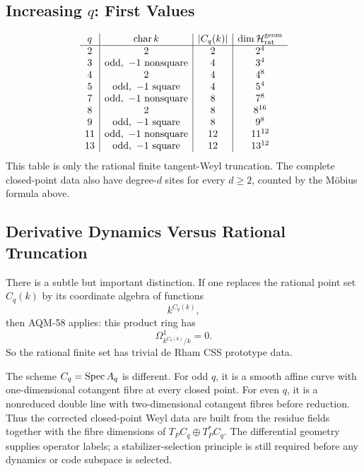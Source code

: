 \subsection{Increasing \texorpdfstring{\(q\)}{q}: First Values}
\[
\begin{array}{c|c|c|c}
q & \operatorname{char} k & |C_q(k)| & \dim \mathcal H_{\rm rat}^{\rm geom}\\ \hline
2 & 2 & 2 & 2^4\\
3 & \text{odd},\ -1\text{ nonsquare} & 4 & 3^4\\
4 & 2 & 4 & 4^8\\
5 & \text{odd},\ -1\text{ square} & 4 & 5^4\\
7 & \text{odd},\ -1\text{ nonsquare} & 8 & 7^8\\
8 & 2 & 8 & 8^{16}\\
9 & \text{odd},\ -1\text{ square} & 8 & 9^8\\
11 & \text{odd},\ -1\text{ nonsquare} & 12 & 11^{12}\\
13 & \text{odd},\ -1\text{ square} & 12 & 13^{12}
\end{array}
\]
This table is only the rational finite tangent-Weyl truncation.  The complete
closed-point data also have degree-\(d\) sites for every \(d\ge2\), counted by
the M\"obius formula above.
\subsection{Derivative Dynamics Versus Rational Truncation}
There is a subtle but important distinction.  If one replaces the rational
point set \(C_q(k)\) by its coordinate algebra of functions
\[
  k^{C_q(k)},
\]
then AQM-58 applies: this product ring has
\[
  \Omega^1_{k^{C_q(k)}/k}=0.
\]
So the rational finite set has trivial de Rham CSS prototype data.

The scheme \(C_q=\operatorname{Spec} A_q\) is different.  For odd \(q\), it is a smooth
affine curve with one-dimensional cotangent fibre at every closed point.  For
even \(q\), it is a nonreduced double line with two-dimensional cotangent
fibres before reduction.  Thus the corrected closed-point Weyl data are built
from the residue fields together with the fibre dimensions of
\(T_PC_q\oplus T_P^*C_q\).  The differential geometry supplies operator labels;
a stabilizer-selection principle is still required before any dynamics or code
subspace is selected.
